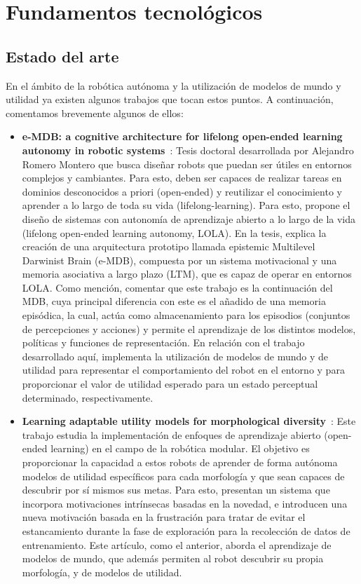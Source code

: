 \chapter{Fundamentos tecnológicos}
\label{chap:fundamentos_tecnologicos}

\section{Estado del arte}
\label{sec:estado_arte}

En el ámbito de la robótica autónoma y la utilización de modelos de mundo y utilidad ya existen 
algunos trabajos que tocan estos puntos. A continuación, comentamos brevemente algunos de ellos:

\begin{itemize}
  \item \textbf{e-MDB: a cognitive architecture for lifelong open-ended learning autonomy in robotic systems}~\cite{romero2022mdb}: 
  Tesis doctoral desarrollada por Alejandro Romero Montero que busca diseñar robots que puedan ser útiles 
  en entornos complejos y cambiantes. Para esto, deben ser capaces de realizar tareas en dominios 
  desconocidos a priori (open-ended) y reutilizar el conocimiento y aprender a lo largo de toda 
  su vida (lifelong-learning). Para esto, propone el diseño de sistemas con autonomía de aprendizaje 
  abierto a lo largo de la vida (lifelong open-ended learning autonomy, LOLA). En la tesis, explica 
  la creación de una arquitectura prototipo llamada epistemic Multilevel Darwinist Brain (e-MDB), 
  compuesta por un sistema motivacional y una memoria asociativa a largo plazo (LTM), que es capaz 
  de operar en entornos LOLA. 
  Como mención, comentar que este trabajo es la continuación del MDB\cite{bellas2010multilevel}, cuya principal 
  diferencia con este es el añadido de una memoria episódica, la cual, actúa como almacenamiento para los 
  episodios (conjuntos de percepciones y acciones) y permite el aprendizaje de los distintos modelos, políticas y funciones de representación.
  En relación con el trabajo desarrollado aquí, implementa la utilización de modelos de mundo y 
  de utilidad para representar el comportamiento del robot en el entorno y para proporcionar el valor 
  de utilidad esperado para un estado perceptual determinado, respectivamente.
  
  \item \textbf{Learning adaptable utility models for morphological diversity}~\cite{campos2024learning}: 
  Este trabajo estudia la implementación de enfoques de aprendizaje abierto (open-ended learning) 
  en el campo de la robótica modular. El objetivo es proporcionar la capacidad a estos robots de 
  aprender de forma autónoma modelos de utilidad específicos para cada morfología y que sean 
  capaces de descubrir por sí mismos sus metas. Para esto, presentan un sistema que incorpora 
  motivaciones intrínsecas basadas en la novedad, e introducen una nueva motivación basada en 
  la frustración para tratar de evitar el estancamiento durante la fase de exploración para la recolección 
  de datos de entrenamiento. Este artículo, como el anterior, aborda el aprendizaje de modelos de mundo, 
  que además permiten al robot descubrir su propia morfología, y de modelos de utilidad.


\end{itemize}
